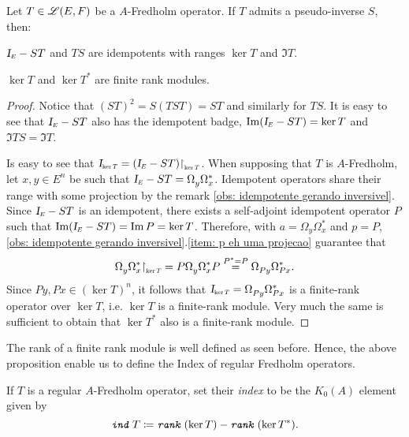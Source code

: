 \begin{proposicao}\label{prop: T fredholm --> ker T e ker T* rank finito}
Let $T \in \mathscr L(E, F)$ be a $A$-Fredholm operator. If $T$ admits a pseudo-inverse $S$, then: 
\begin{itroman}
\item $\sub \Id E - ST$ and $TS$ are idempotents with ranges $\ker T$ and $\Im T$. 
\item $\ker T$ and $\ker T^*$ are finite rank modules.
\end{itroman}
\begin{proof}
Notice that $(ST)^2 = S(TST) = ST$ and similarly for $TS$. It is easy to see that $\sub\Id E-ST$ also has the idempotent badge, $\Im(\sub \Id E - ST) = \ker T$ and $\Im TS = \Im T$.

Is easy to see that $\sub \Id{\ker T} = (\sub \Id E - ST)\sub\restrita{\ker T}$. When supposing that $T$ is $A$-Fredholm, let $x,y \in E^n$ be such that $\sub \Id E - ST = \Omega_{y}^{\,}\Omega_x^*$. Idempotent operators share their range with some projection by the remark \ref{obs: idempotente gerando inversivel}. Since $\sub\Id E - ST$ is an idempotent, there exists a self-adjoint idempotent operator $P$ such that $\Im(\sub\Id E - ST) = \Im P = \ker T$. Therefore, with $a= \Omega_{y}^{\,}\Omega_x^*$ and $p = P$, \ref{obs: idempotente gerando inversivel}.\ref{item: p eh uma projecao} guarantee that
\begin{equation*}
    \Omega_{y}^{\,}\Omega_x^* \sub{\restrita}{\ker T} = P\Omega_{y}^{\,}\Omega_x^*P \overset{P^*=P}= \Omega_{Py}^{\,} \Omega_{Px}^*.
\end{equation*}
Since $Py, Px \in (\ker T)^n$, it follows that $\sub\Id{\ker T} = \Omega_{Py}^{\,} \Omega_{Px}^*$ is a finite-rank operator over $\ker T$, i.e. $\ker T$ is a finite-rank module. Very much the same is sufficient to obtain that $\ker T^*$ also is a finite-rank module.
\end{proof}
\end{proposicao}

The rank of a finite rank module is well defined as seen before. Hence, the above proposition enable us to define the Index of regular Fredholm operators.

\begin{definicao}
If $T$ is a regular $A$-Fredholm operator, set their \textit{index} to be the $K_0(A)$ element given by
\[
\texttt{\textit{ind}}\, T \coloneqq \texttt{\textit{rank}}\,(\ker T) - \texttt{\textit{rank}}\,(\ker T^*).
\]
\end{definicao}

